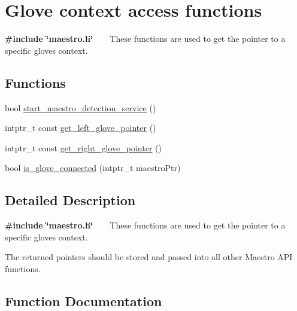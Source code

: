 \hypertarget{group__glove_context_access}{}\section{Glove context access functions}
\label{group__glove_context_access}


{\bfseries {\ttfamily \#include \char`\"{}maestro.\+h\char`\"{}}} ~\newline
 ~\newline
 These functions are used to get the pointer to a specific glove\textquotesingle{}s context.  


\subsection*{Functions}
\begin{DoxyCompactItemize}
\item 
bool \hyperlink{group__glove_context_access_ga10088517f643220611dfcd5da08bfaa1}{start\+\_\+maestro\+\_\+detection\+\_\+service} ()
\item 
intptr\+\_\+t const \hyperlink{group__glove_context_access_ga63ce3c99d4a8b8db851b22af9185764e}{get\+\_\+left\+\_\+glove\+\_\+pointer} ()
\item 
intptr\+\_\+t const \hyperlink{group__glove_context_access_ga9b8fd9d91aeac3f8da50f7a7eba0c32b}{get\+\_\+right\+\_\+glove\+\_\+pointer} ()
\item 
bool \hyperlink{group__glove_context_access_ga85666868951331c5266df7559abeefbc}{is\+\_\+glove\+\_\+connected} (intptr\+\_\+t maestro\+Ptr)
\end{DoxyCompactItemize}


\subsection{Detailed Description}
{\bfseries {\ttfamily \#include \char`\"{}maestro.\+h\char`\"{}}} ~\newline
 ~\newline
 These functions are used to get the pointer to a specific glove\textquotesingle{}s context. 

The returned pointers should be stored and passed into all other Maestro A\+PI functions. 

\subsection{Function Documentation}
\mbox{\label{group__glove_context_access_ga63ce3c99d4a8b8db851b22af9185764e}} 
